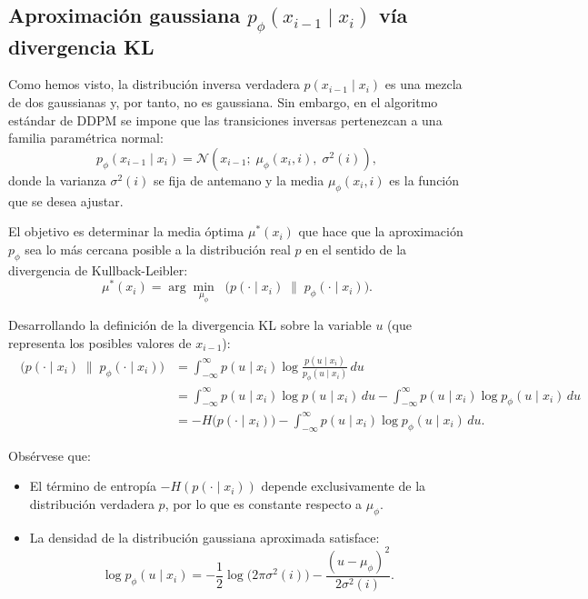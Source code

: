 \documentclass[11pt,a4paper]{article}
\DeclareMathOperator{\DKL}{\mathcal{D}_{\mathrm{KL}}}
\begin{document}
\subsection{Aproximación gaussiana $p_\phi(x_{i-1} \mid x_i)$ vía divergencia KL}

Como hemos visto, la distribución inversa verdadera $p(x_{i-1} \mid x_i)$ es una mezcla de dos gaussianas y, por tanto, no es gaussiana. Sin embargo, en el algoritmo estándar de DDPM se impone que las transiciones inversas pertenezcan a una familia paramétrica normal:
\[
p_\phi(x_{i-1} \mid x_i) = \mathcal{N}\left(x_{i-1};\; \mu_\phi(x_i, i),\; \sigma^2(i)\right),
\]
donde la varianza $\sigma^2(i)$ se fija de antemano y la media $\mu_\phi(x_i, i)$ es la función que se desea ajustar.

El objetivo es determinar la media óptima $\mu^*(x_i)$ que hace que la aproximación $p_\phi$ sea lo más cercana posible a la distribución real $p$ en el sentido de la divergencia de Kullback-Leibler:
\[
\mu^*(x_i) = \arg\min_{\mu_\phi} \DKL\Big(p(\cdot \mid x_i) \;\Big\|\; p_\phi(\cdot \mid x_i)\Big).
\]

Desarrollando la definición de la divergencia KL sobre la variable $u$ (que representa los posibles valores de $x_{i-1}$):
\begin{align*}
    \DKL\Big(p(\cdot \mid x_i) \;\Big\|\; p_\phi(\cdot \mid x_i)\Big) 
    &= \int_{-\infty}^\infty p(u \mid x_i) \log \frac{p(u \mid x_i)}{p_\phi(u \mid x_i)} \, du \\
    &= \int_{-\infty}^\infty p(u \mid x_i) \log p(u \mid x_i) \, du - \int_{-\infty}^\infty p(u \mid x_i) \log p_\phi(u \mid x_i) \, du \\
    &= -H\big(p(\cdot \mid x_i)\big) - \int_{-\infty}^\infty p(u \mid x_i) \log p_\phi(u \mid x_i) \, du.
\end{align*}

Obsérvese que:
\begin{itemize}
    \item El término de entropía $-H(p(\cdot \mid x_i))$ depende exclusivamente de la distribución verdadera $p$, por lo que es constante respecto a $\mu_\phi$.
    \item La densidad de la distribución gaussiana aproximada satisface:
    \[
    \log p_\phi(u \mid x_i) = -\frac{1}{2}\log\big(2\pi\sigma^2(i)\big) - \frac{(u - \mu_\phi)^2}{2\sigma^2(i)}.
    \]
\end{itemize}
\end{document}
